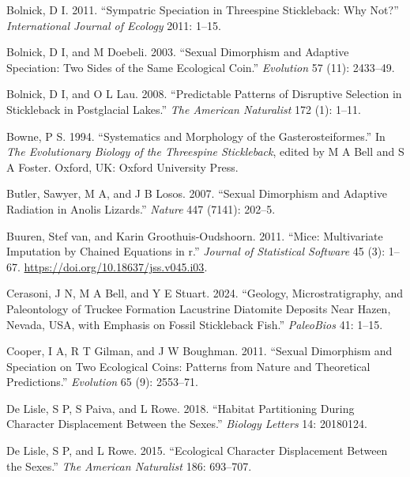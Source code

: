 \documentclass[
  12pt,
]{article}
\newlength{\cslhangindent}
\newlength{\cslentryspacingunit} %
\newenvironment{CSLReferences}[2] %
 {%
  \setlength{\parindent}{0pt}
  \ifodd #1
  \let\oldpar\par
  \def\par{\hangindent=\cslhangindent\oldpar}
  \fi
  \setlength{\parskip}{#2\cslentryspacingunit}
 }%
 {}
\begin{document}
\begin{CSLReferences}{1}{0}
\leavevmode{}%
Bolnick, D I. 2011. {``Sympatric Speciation in Threespine Stickleback:
Why Not?''} \emph{International Journal of Ecology} 2011: 1--15.

\leavevmode{}%
Bolnick, D I, and M Doebeli. 2003. {``Sexual Dimorphism and Adaptive
Speciation: Two Sides of the Same Ecological Coin.''} \emph{Evolution}
57 (11): 2433--49.

\leavevmode{}%
Bolnick, D I, and O L Lau. 2008. {``Predictable Patterns of Disruptive
Selection in Stickleback in Postglacial Lakes.''} \emph{The American
Naturalist} 172 (1): 1--11.

\leavevmode{}%
Bowne, P S. 1994. {``Systematics and Morphology of the
Gasterosteiformes.''} In \emph{The Evolutionary Biology of the
Threespine Stickleback}, edited by M A Bell and S A Foster. Oxford, UK:
Oxford University Press.

\leavevmode{}%
Butler, Sawyer, M A, and J B Losos. 2007. {``Sexual Dimorphism and
Adaptive Radiation in Anolis Lizards.''} \emph{Nature} 447 (7141):
202--5.

\leavevmode{}%
Buuren, Stef van, and Karin Groothuis-Oudshoorn. 2011. {``Mice:
Multivariate Imputation by Chained Equations in r.''} \emph{Journal of
Statistical Software} 45 (3): 1--67.
\url{https://doi.org/10.18637/jss.v045.i03}.

\leavevmode{}%
Cerasoni, J N, M A Bell, and Y E Stuart. 2024. {``Geology,
Microstratigraphy, and Paleontology of Truckee Formation Lacustrine
Diatomite Deposits Near Hazen, Nevada, USA, with Emphasis on Fossil
Stickleback Fish.''} \emph{PaleoBios} 41: 1--15.

\leavevmode{}%
Cooper, I A, R T Gilman, and J W Boughman. 2011. {``Sexual Dimorphism
and Speciation on Two Ecological Coins: Patterns from Nature and
Theoretical Predictions.''} \emph{Evolution} 65 (9): 2553--71.

\leavevmode{}%
De Lisle, S P, S Paiva, and L Rowe. 2018. {``Habitat Partitioning During
Character Displacement Between the Sexes.''} \emph{Biology Letters} 14:
20180124.

\leavevmode{}%
De Lisle, S P, and L Rowe. 2015. {``Ecological Character Displacement
Between the Sexes.''} \emph{The American Naturalist} 186: 693--707.


\end{CSLReferences}
\end{document}
